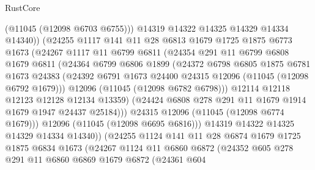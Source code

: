 \begin{lexlean}{RustCore}
\begin{coremodule}
                        (@11045 (@12098 @6703 @6755)))
                      @14319
                      @14322
                      @14325
                      @14329
                      @14334
                      @14340))
                  (@24255
                    @1117
                    @141
                    @11
                    @28
                    @6813
                    @1679
                    @1725
                    @1875
                    @6773
                    @1673
                    (@24267
                      @1117
                      @11
                      @6799
                      @6811
                      (@24354
                        @291
                        @11
                        @6799
                        @6808
                        @1679
                        @6811
                        (@24364
                          @6799
                          @6806
                          @1899
                          (@24372
                            @6798
                            @6805
                            @1875
                            @6781
                            @1673
                            @24383
                            (@24392 @6791 @1673 @24400 @24315 @12096 (@11045 (@12098 @6792 @1679)))
                            @12096
                            (@11045 (@12098 @6782 @6798)))
                          @12114
                          @12118
                          @12123
                          @12128
                          @12134
                          @13359)
                        (@24424 @6808 @278 @291 @11 @1679 @1914 @1679 @1947 @24437 @25184)))
                    @24315
                    @12096
                    (@11045 (@12098 @6774 @1679)))
                  @12096
                  (@11045 (@12098 @6695 @6816)))
                @14319
                @14322
                @14325
                @14329
                @14334
                @14340))
            (@24255
              @1124
              @141
              @11
              @28
              @6874
              @1679
              @1725
              @1875
              @6834
              @1673
              (@24267
                @1124
                @11
                @6860
                @6872
                (@24352
                  @605
                  @278
                  @291
                  @11
                  @6860
                  @6869
                  @1679
                  @6872
                  (@24361
                    @604

\end{coremodule}
\end{lexlean}
